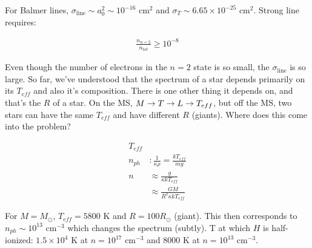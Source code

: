 For Balmer lines, $\sigma_{\text{line}} \sim a_0^2 \sim 10^{-16}$ cm$^2$ and $\sigma_T \sim 6.65 \times 10^{-25}$ cm$^2$. Strong line requires:

\begin{align}
\frac{n_{n=2}}{n_{tot}} \geq 10^{-8}
\end{align}

Even though the number of electrons in the $n=2$ state is so small, the $\sigma_{\text{line}} $ is so large. So far, we've understood that the spectrum of a star depends primarily on its $T_{eff}$ and also it's composition. There is one other thing it depends on, and that's the $R$ of a star. On the MS, $M \rightarrow T \rightarrow L \rightarrow T_{eff}$, but off the MS, two stars can have the same $T_{eff}$ and have different $R$ (giants). Where does this come into the problem?

\begin{align}
T_{eff} \\
n_{ph} &: \frac{1}{\kappa \rho} = \frac{kT_{eff}}{mg}\\
n &\approx \frac{g}{\kappa kT_{eff}}\\
&\approx \frac{GM}{R^2 \kappa kT_{eff}}
\end{align}

For $M = M_\odot$, $T_{eff} = 5800$ K and $R = 100R_\odot$ (giant). This then corresponds to $n_{ph} \sim 10^{13}$ cm$^{-3}$ which changes the spectrum (subtly). T at which $H$ is half-ionized: $1.5 \times 10^4$ K at $n=10^{17}$ cm$^{-3}$ and $8000$ K at $n = 10^{13}$ cm$^{-3}$. 